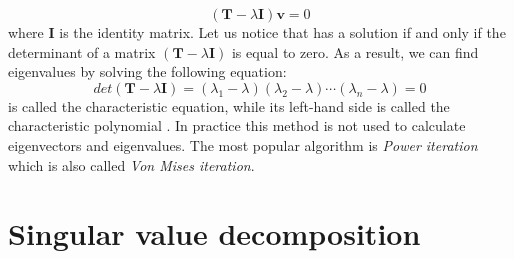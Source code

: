 \documentclass[english,a4paper,twoside]{ppfcmthesis}
\begin{document}
\begin{appendices}
\begin{equation}\label{eq:eigen2}
    (\boldsymbol{T}-\lambda{\boldsymbol{I}})\boldsymbol{v}=0
\end{equation}
where $\boldsymbol{I}$ is the identity matrix. Let us notice that  has a solution if and only if the determinant of a matrix $(\boldsymbol{T}-\lambda{\boldsymbol{I}})$ is equal to zero. As a result, we can find eigenvalues by solving the following equation:
\begin{equation}\label{eq:eigen3}
    det(\boldsymbol{T}-\lambda{\boldsymbol{I}}) = (\lambda_1-\lambda)(\lambda_2-\lambda)\cdots(\lambda_n-\lambda) = 0
\end{equation}
 is called the characteristic equation, while its left-hand side is called the characteristic polynomial \citep{Banerjee}. In practice this method is not used to calculate eigenvectors and eigenvalues. The most popular algorithm is \textit{Power iteration} which is also called \textit{Von Mises iteration}.


\newpage
\section{Singular value decomposition}
\label{app:svd}


\end{appendices}
\end{document}
